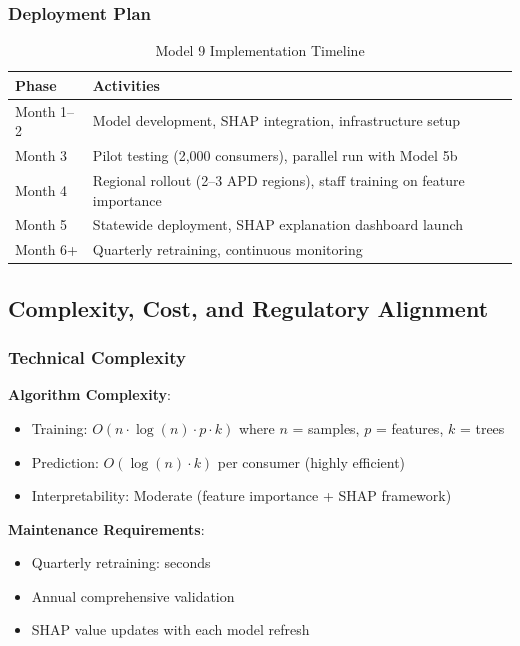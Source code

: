 \subsubsection{Deployment Plan}

\begin{table}[h]
\centering
\caption{Model 9 Implementation Timeline}
\begin{tabular}{lp{10cm}}
\toprule
\textbf{Phase} & \textbf{Activities} \\
\midrule
Month 1--2 & Model development, SHAP integration, infrastructure setup \\
Month 3 & Pilot testing (2,000 consumers), parallel run with Model 5b \\
Month 4 & Regional rollout (2--3 APD regions), staff training on feature importance \\
Month 5 & Statewide deployment, SHAP explanation dashboard launch \\
Month 6+ & Quarterly retraining, continuous monitoring \\
\bottomrule
\end{tabular}
\label{tab:model9_deployment}
\end{table}

\subsection{Complexity, Cost, and Regulatory Alignment}

\subsubsection{Technical Complexity}

\textbf{Algorithm Complexity}:
\begin{itemize}
    \item Training: $O(n \cdot \log(n) \cdot p \cdot k)$ where $n$ = samples, $p$ = features, $k$ = trees
    \item Prediction: $O(\log(n) \cdot k)$ per consumer (highly efficient)
    \item Interpretability: Moderate (feature importance + SHAP framework)
\end{itemize}

\textbf{Maintenance Requirements}:
\begin{itemize}
    \item Quarterly retraining: \ModelNineTrainingTime{} seconds
    \item Annual comprehensive validation
    \item SHAP value updates with each model refresh
\end{itemize}

